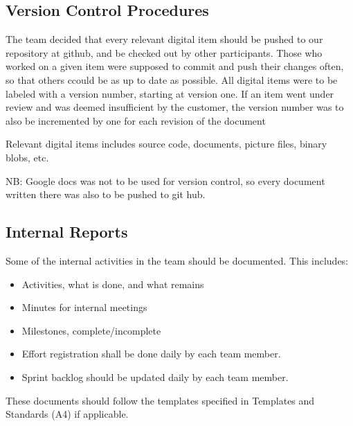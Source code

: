 \subsection{Version Control Procedures}
The team decided that every relevant digital item should be pushed to our \gls{repository} at github, and be checked out by other participants. Those who worked on a given item were supposed to commit and push their changes often, so that others ccould be as up to date as possible. All digital items were to be labeled with a version number, starting at version one. If an item went under review and was deemed insufficient by the customer, the version number was to also be incremented by one for each revision of the document

Relevant digital items includes source code, documents, picture files, binary blobs, etc.

NB: Google docs was not to be used for version control, so every document written there was also to be pushed to git hub.

\subsection{Internal Reports}
Some of the internal activities in the team should be documented. This includes:
\begin{itemize}
	\item Activities, what is done, and what remains
	\item Minutes for internal meetings
	\item Milestones, complete/incomplete
	\item Effort registration shall be done daily by each team member.
	\item Sprint backlog should be updated daily by each team member.
\end{itemize}
These documents should follow the templates specified in Templates and Standards (A4) if applicable.


